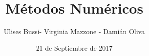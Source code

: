 \title{Métodos Numéricos}
\author{Ulises Bussi- Virginia Mazzone - Damián Oliva}
\date{ 21 de Septiembre de 2017} 






 


\begin{frame} %
	\titlepage
\end{frame}

